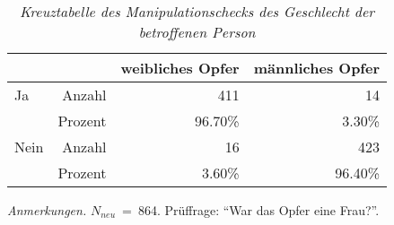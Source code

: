 \begin{table}[htb]
    \caption[Kreuztabelle Manipulationscheck Opfergeschlecht]{\textit {Kreuztabelle des Manipulationschecks des Geschlecht der betroffenen Person}} 
    \label{KT_sex}
    \centering
    \begin{adjustbox}{width=10cm} %
    \small
    \begin{tabular}{lrrr}
      \hline
        &   & weibliches Opfer & männliches Opfer \\
      \hline
    Ja   & Anzahl  & 411      & 14      \\
    & Prozent & 96.70\%  & 3.30\%  \\
    Nein & Anzahl  & 16       & 423     \\
    & Prozent & 3.60\%   & 96.40\% \\
       \hline
    \end{tabular}
    \end{adjustbox}
    
    \begin{tablenotes}
        \item \textit{Anmerkungen.} \( N_{neu} \)~=~864. Prüffrage: \enquote{War das Opfer eine Frau?}.
      \end{tablenotes}
    \end{table}


